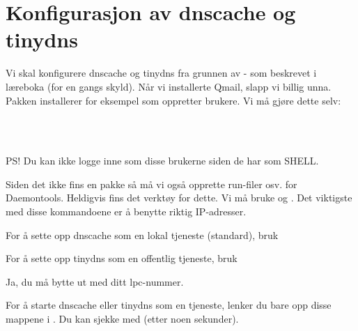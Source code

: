 \section{Konfigurasjon av dnscache og tinydns}



Vi skal konfigurere dnscache og tinydns fra grunnen av - som beskrevet i læreboka (for en gangs skyld).
Når vi installerte Qmail, slapp vi billig unna. Pakken  installerer for eksempel 
 som oppretter brukere. Vi må gjøre dette selv:

\\
\\

PS! Du kan ikke logge inne som disse brukerne siden de har  som SHELL. 

Siden det ikke fins en  pakke så må vi også opprette run-filer osv. for Daemontools.
Heldigvis fins det verktøy for dette. Vi må bruke  og .
Det viktigste med disse kommandoene er å benytte riktig IP-adresser.

For å sette opp dnscache som en lokal tjeneste (standard), bruk


For å sette opp tinydns som en offentlig tjeneste, bruk


Ja, du må bytte ut  med ditt lpc-nummer.
 
For å starte dnscache eller tinydns som en tjeneste, lenker 
du bare opp disse mappene i .
Du kan sjekke med  (etter noen sekunder).

\\

\\

